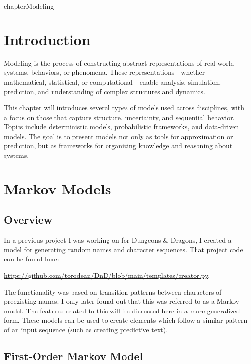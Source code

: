 chapter{Modeling}
\thispagestyle{fancy}
\label{chap:modeling}





\section{Introduction}

Modeling is the process of constructing abstract representations of real-world systems, behaviors, or phenomena. These representations—whether mathematical, statistical, or computational—enable analysis, simulation, prediction, and understanding of complex structures and dynamics.

This chapter will introduces several types of models used across disciplines, with a focus on those that capture structure, uncertainty, and sequential behavior. Topics include deterministic models, probabilistic frameworks, and data-driven models. The goal is to present models not only as tools for approximation or prediction, but as frameworks for organizing knowledge and reasoning about systems.










\section{Markov Models}

\subsection{Overview}

In a previous project I was working on for Dungeons \& Dragons, I created a model for generating random names and character sequences. That project code can be found here: 
\begin{center}
\url{https://github.com/torodean/DnD/blob/main/templates/creator.py}. 
\end{center}
The functionality was based on transition patterns between characters of preexisting names. I only later found out that this was referred to as a Markov model. The features related to this will be discussed here in a more generalized form. These models can be used to create elements which follow a similar pattern of an input sequence (such as creating predictive text).

\subsection{First-Order Markov Model}

